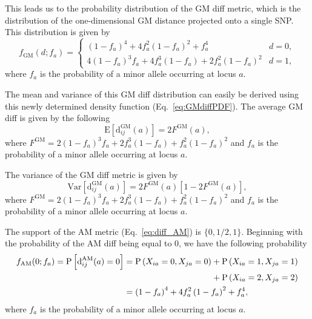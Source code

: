 \documentclass[10pt,letterpaper]{article}
\begin{document}
This leads us to the probability distribution of the GM diff metric, which is the distribution of the one-dimensional GM distance projected onto a single SNP. This distribution is given by
%
\begin{equation}\label{eq:GMdiffPDF}
f_\text{GM}(d;f_a) = \begin{cases}
\left(1 - f_a\right)^4 + 4 f^2_a \left(1 - f_a\right)^2 + f^4_a & d=0, \\
4\left(1 - f_a\right)^3 f_a + 4 f^3_a \left(1 - f_a\right) + 2 f^2_a \left(1 - f_a\right)^2 & d=1,
\end{cases}
\end{equation}
%
where $f_a$ is the probability of a minor allele occurring at locus $a$. 

The mean and variance of this GM diff distribution can easily be derived using this newly determined density function (Eq.~\ref{eq:GMdiffPDF}). The average GM diff is given by the following
%
\begin{equation}\label{eq:GMdiffMean}
\text{E}\left[\text{d}^\text{GM}_{ij}(a)\right] = 2 F^\text{GM}(a),
\end{equation}
%
where $F^\text{GM} = 2 \left(1 - f_a\right)^3 f_a + 2 f^3_a \left(1 - f_a\right) + f^2_a \left(1 - f_a\right)^2$ and $f_a$ is the probability of a minor allele occurring at locus $a$.

The variance of the GM diff metric is given by
%
\begin{equation}\label{eq:GMdiffVar}
\text{Var}\left[\text{d}^\text{GM}_{ij}(a)\right] = 2 F^\text{GM}(a)\left[1 - 2 F^\text{GM}(a)\right],
\end{equation}
%
where $F^\text{GM} = 2 \left(1 - f_a\right)^3 f_a + 2 f^3_a \left(1 - f_a\right) + f^2_a \left(1 - f_a\right)^2$ and $f_a$ is the probability of a minor allele occurring at locus $a$.

The support of the AM metric (Eq.~\ref{eq:diff_AM}) is $\{0,1/2,1\}$. Beginning with the probability of the AM diff being equal to 0, we have the following probability
%
\begin{equation}\label{eq:probAM0}
\begin{aligned}
f_\text{AM}(0;f_a) = \text{P}\left[\text{d}^\text{AM}_{ij}(a) = 0\right] &= 
\text{P}\left(X_{ia}=0,X_{ja}=0\right) + \text{P}\left(X_{ia}=1,X_{ja}=1\right) \\
& \hspace{3.64cm} + \text{P}\left(X_{ia}=2,X_{ja}=2\right) \\
&= \left(1 - f_a\right)^4 + 4 f^2_a \left(1 - f_a\right)^2 + f^4_a,
\end{aligned}
\end{equation}
%
where $f_a$ is the probability of a minor allele occurring at locus $a$.
\end{document}
